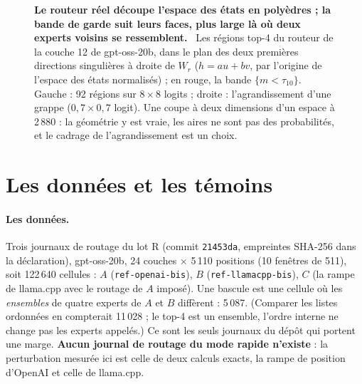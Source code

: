 \begin{figure}[tbp]
\centering
\FigureTropicaleCoupe
\caption[Les polyèdres réels du routeur de la couche 12]{\textbf{Le routeur réel découpe l'espace des états en polyèdres ; la bande de garde suit leurs faces, plus large là où deux experts voisins se ressemblent.} \calc~Les régions top-4 du routeur de la couche 12 de gpt-oss-20b, dans le plan des deux premières directions singulières à droite de $W_r$ ($h = a u + b v$, par l'origine de l'espace des états normalisés) ; en rouge, la bande $\{m < \tau_{10}\}$. Gauche : 92 régions sur $8 \times 8$ logits ; droite : l'agrandissement d'une grappe ($0{,}7 \times 0{,}7$ logit). Une coupe à deux dimensions d'un espace à 2\,880 : la géométrie y est vraie, les aires ne sont pas des probabilités, et le cadrage de l'agrandissement est un choix. \HorsStyle{}}
\label{fig:t3-trop-coupe}
\end{figure}

\section{Les données et les témoins}\label{t3tro:sec:donnees}

\paragraph{Les données.} Trois journaux de routage du lot R (commit \texttt{21453da}, empreintes SHA-256 dans la déclaration), gpt-oss-20b, 24 couches $\times$ 5\,110 positions (10 fenêtres de 511), soit 122\,640 cellules : $A$ (\texttt{ref-openai-bis}), $B$ (\texttt{ref-llamacpp-bis}), $C$ (la rampe de llama.cpp avec le routage de $A$ imposé). Une bascule est une cellule où les \emph{ensembles} de quatre experts de $A$ et $B$ diffèrent : 5\,087. (Comparer les listes ordonnées en compterait 11\,028 ; le top-4 est un ensemble, l'ordre interne ne change pas les experts appelés.) Ce sont les seuls journaux du dépôt qui portent une marge. \textbf{Aucun journal de routage du mode rapide n'existe} : la perturbation mesurée ici est celle de deux calculs exacts, la rampe de position d'OpenAI et celle de llama.cpp.

